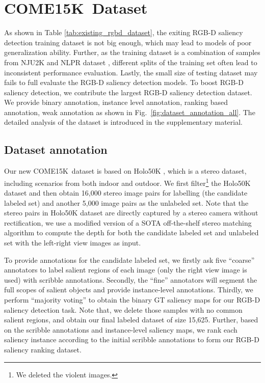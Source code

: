 \documentclass[10pt,twocolumn,letterpaper]{article}
\def\ourdataset{COME15K}
\begin{document}
\section{\ourdataset~Dataset}
\label{the_new_dataset}
As shown in Table \ref{tab:existing_rgbd_dataset}, the exiting RGB-D saliency detection training dataset is not big enough, which may lead to models of poor generalization ability. Further, as the training dataset is a combination of samples from NJU2K \cite{NJU2000} and NLPR dataset \cite{peng2014rgbd}, different splits
of the training set often lead to inconsistent performance evaluation. Lastly, the small size of testing dataset may fails to full evaluate the RGB-D saliency detection models.
To boost 
RGB-D saliency detection, we contribute the largest RGB-D saliency detection dataset. We provide binary annotation, instance level annotation, ranking based annotation, weak annotation as shown in Fig.~\ref{fig:dataset_annotation_all}. The detailed analysis of the dataset is introduced in the supplementary material.



\subsection{Dataset annotation}
\label{dataset_annotation}
Our new \ourdataset~dataset is based on Holo50K \cite{hua2020holopix50k}, which is a stereo dataset, including scenarios from both indoor and outdoor. We first filter\footnote{We deleted the violent images.} the Holo50K dataset and then obtain
16,000 stereo image pairs for labelling (the candidate labeled set) and another 5,000 image pairs as the unlabeled set. Note that the stereo pairs in Holo50K dataset are directly captured by a stereo camera without rectification, we use a modified version of a SOTA off-the-shelf stereo matching algorithm \cite{zhong2020displacement} to compute the depth for both the candidate labeled set and unlabeled set with the left-right view images as input.


To provide annotations for the candidate labeled set, we firstly ask five \enquote{coarse} annotators to
label salient regions of each image (only the right view image is used) with scribble annotations.
Secondly, the \enquote{fine} annotators will segment the full scopes of salient objects and provide instance-level annotations.
Thirdly, we perform \enquote{majority voting} to obtain the binary GT saliency maps for our RGB-D saliency detection task. Note that, we delete those samples with no common salient regions, and obtain our final labeled dataset of size 15,625. 
Further, based on the scribble annotations and instance-level saliency maps, we rank each saliency instance according to the initial scribble annotations to form our RGB-D saliency ranking dataset. 
\end{document}
